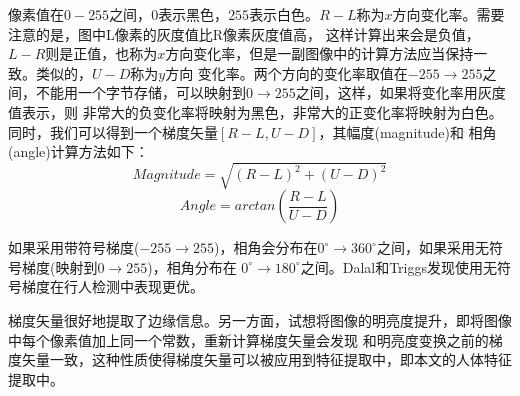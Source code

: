 \documentclass[10pt,technote,onecolumn,twoside]{IEEEtran}
\begin{document}
像素值在$0-255$之间，$0$表示黑色，$255$表示白色。$R-L$称为$x$方向变化率。需要注意的是，图中L像素的灰度值比R像素灰度值高，
这样计算出来会是负值，$L-R$则是正值，也称为$x$方向变化率，但是一副图像中的计算方法应当保持一致。类似的，$U-D$称为$y$方向
变化率。两个方向的变化率取值在$-255\to255$之间，不能用一个字节存储，可以映射到$0\to255$之间，这样，如果将变化率用灰度值表示，则
非常大的负变化率将映射为黑色，非常大的正变化率将映射为白色。同时，我们可以得到一个梯度矢量$[R-L,U-D]$，其幅度(magnitude)和
相角(angle)计算方法如下：
\[Magnitude=\sqrt{(R-L)^2+(U-D)^2}\]
\[Angle=arctan\left(\frac{R-L}{U-D}\right)\]

如果采用带符号梯度($-255\to255$)，相角会分布在$0^\circ\to360^\circ$之间，如果采用无符号梯度(映射到$0\to255$)，相角分布在
$0^\circ\to180^\circ$之间。Dalal和Triggs发现使用无符号梯度在行人检测中表现更优。

梯度矢量很好地提取了边缘信息。另一方面，试想将图像的明亮度提升，即将图像中每个像素值加上同一个常数，重新计算梯度矢量会发现
和明亮度变换之前的梯度矢量一致，这种性质使得梯度矢量可以被应用到特征提取中，即本文的人体特征提取中。
\end{document}
